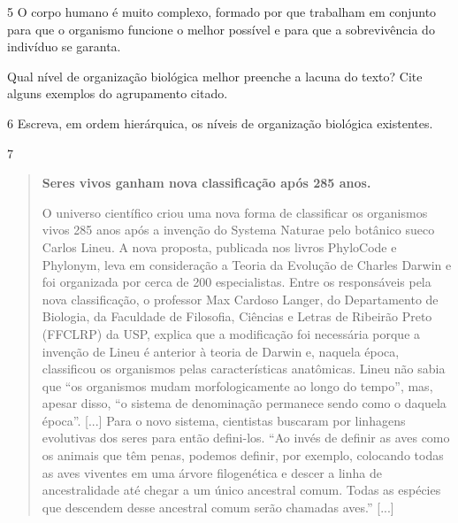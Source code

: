 \num{5}  O corpo humano é muito complexo, formado por \preencher 
  que trabalham em conjunto para que o organismo funcione o melhor possível e para que a sobrevivência do indivíduo se garanta.


Qual nível de organização biológica melhor preenche a lacuna do texto?
Cite alguns exemplos do agrupamento citado.


\num{6}  Escreva, em ordem hierárquica, os níveis de organização biológica existentes.



\num{7}

\begin{quote}
\textbf{Seres vivos ganham nova classificação após 285 anos.}

O universo científico criou uma nova forma de classificar os organismos
vivos 285 anos após a invenção do Systema Naturae pelo botânico sueco
Carlos Lineu. A nova proposta, publicada nos livros PhyloCode e
Phylonym, leva em consideração a Teoria da Evolução de Charles Darwin e
foi organizada por cerca de 200 especialistas. 
Entre os responsáveis
pela nova classificação, o professor Max Cardoso Langer, do Departamento
de Biologia, da Faculdade de Filosofia, Ciências e Letras de Ribeirão
Preto (FFCLRP) da USP, explica que a modificação foi necessária porque a
invenção de Lineu é anterior à teoria de Darwin e, naquela época,
classificou os organismos pelas características anatômicas. Lineu não
sabia que ``os organismos mudam morfologicamente ao longo do tempo'',
mas, apesar disso, ``o sistema de denominação permanece sendo como o
daquela época''.  [...]
Para o novo sistema, cientistas buscaram por linhagens
evolutivas dos seres para então defini-los. ``Ao invés de definir as
aves como os animais que têm penas, podemos definir, por exemplo,
colocando todas as aves viventes em uma árvore filogenética e descer a
linha de ancestralidade até chegar a um único ancestral comum. Todas as
espécies que descendem desse ancestral comum serão chamadas aves.'' [...]

\end{quote}

